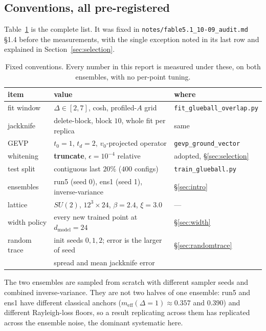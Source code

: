 \documentclass[11pt,a4paper]{article}
\newcommand{\meff}{m_{\mathrm{eff}}}
\begin{document}
\subsection{Conventions, all pre-registered}
\label{sec:conventions}

Table~\ref{tab:conv} is the complete list. It was fixed in
\texttt{notes/fable5.1\_10-09\_audit.md} \S1.4 before the measurements, with the
single exception noted in its last row and explained in
Section~\ref{sec:selection}.

\begin{table}[htbp]
\centering\small
\caption{Fixed conventions. Every number in this report is measured under
these, on both ensembles, with no per-point tuning.}
\label{tab:conv}
\begin{tabular}{@{}lll@{}}
\toprule
item & value & where \\
\midrule
fit window            & $\Delta \in [2,7]$, cosh, profiled-$A$ grid & \texttt{fit\_glueball\_overlap.py} \\
jackknife             & delete-block, block $10$, whole fit per replica & same \\
GEVP                  & $t_0 = 1$, $t_d = 2$, $v_0$-projected operator & \texttt{gevp\_ground\_vector} \\
whitening             & \textbf{truncate}, $\epsilon = 10^{-4}$ relative & adopted, \S\ref{sec:selection} \\
test split            & contiguous last $20\%$ ($400$ configs) & \texttt{train\_glueball.py} \\
ensembles             & run5 (seed 0), ens1 (seed 1), inverse-variance & \S\ref{sec:intro} \\
lattice               & $SU(2)$, $12^3\times24$, $\beta=2.4$, $\xi=3.0$ & --- \\
width policy          & every new trained point at $d_{\text{model}} = 24$ & \S\ref{sec:width} \\
random trace          & init seeds $0,1,2$; error is the larger of seed & \S\ref{sec:randomtrace} \\
                      & spread and mean jackknife error & \\
\bottomrule
\end{tabular}
\end{table}

The two ensembles are sampled from scratch with different sampler seeds and
combined inverse-variance. They are not two halves of one ensemble: run5 and
ens1 have different classical anchors ($\meff(\Delta=1) \approx 0.357$ and
$0.390$) and different Rayleigh-loss floors, so a result replicating across them
has replicated across the ensemble noise, the dominant systematic here.
\end{document}
